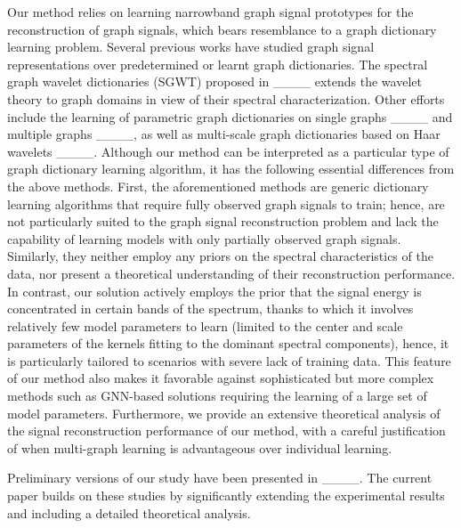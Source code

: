 



Our method relies on learning narrowband graph signal prototypes for the reconstruction of graph signals, which bears resemblance to a graph dictionary learning problem. Several previous works have studied graph signal representations over predetermined or learnt graph dictionaries. The  spectral graph wavelet dictionaries (SGWT) proposed in ____ extends the wavelet theory to graph domains in view of their spectral characterization. Other efforts include the learning of parametric graph dictionaries on single graphs ____ and multiple graphs ____, as well as multi-scale graph dictionaries based on Haar wavelets ____. Although our method can be interpreted as a particular type of graph dictionary learning algorithm, it has the following essential differences from the above methods. First, the aforementioned methods are generic dictionary learning algorithms that require fully observed graph signals to train; hence, are not particularly suited to the graph signal reconstruction problem and lack the capability of learning models with only partially observed graph signals. Similarly, they neither  employ any priors on the spectral characteristics of the data, nor present a theoretical understanding of their reconstruction performance. In contrast, our solution actively employs the prior that the signal energy is concentrated in certain bands of the spectrum, thanks to which it involves relatively few model parameters to learn (limited to the center and scale parameters of the kernels fitting to the dominant spectral components), hence, it is particularly tailored to scenarios with severe lack of training data. This feature of our method also makes it favorable against sophisticated but more complex methods such as GNN-based solutions requiring the learning of a large set of model parameters.  Furthermore, we provide an extensive theoretical analysis of the signal reconstruction performance of our method, with a careful justification of when multi-graph learning is advantageous over individual learning.




Preliminary versions of our study have been presented in ____. The current paper builds on these studies by significantly extending the experimental results and including a detailed theoretical analysis.